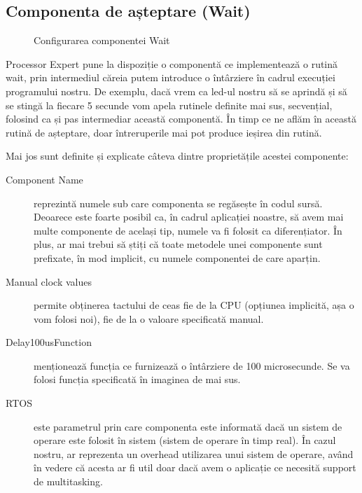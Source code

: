 \newpage

\subsection{Componenta de așteptare (Wait)}

\begin{figure}
    \vspace{-25pt}
    \vspace{-20pt}
    \caption{\label{fig:CodeWarrior-Wait} Configurarea componentei Wait}
    \vspace{-10pt}
\end{figure}

Processor Expert pune la dispoziție o componentă ce implementează o rutină wait, prin intermediul căreia putem introduce o întârziere în cadrul execuției programului nostru. De exemplu, dacă vrem ca led-ul nostru să se aprindă și să se stingă la fiecare 5 secunde vom apela rutinele definite mai sus, secvențial, folosind ca și pas intermediar această componentă. În timp ce ne aflăm în această rutină de așteptare, doar întreruperile mai pot produce ieșirea din rutină.

Mai jos sunt definite și explicate câteva dintre proprietățile acestei componente:

\begin{description}
    \item[Component Name] reprezintă numele sub care componenta se regăsește în codul sursă. Deoarece este foarte posibil ca, în cadrul aplicației noastre, să avem mai multe componente de același tip, numele va fi folosit ca diferențiator. În plus, ar mai trebui să știți că toate metodele unei componente sunt prefixate, în mod implicit, cu numele componentei de care aparțin.
    \item[Manual clock values] permite obținerea tactului de ceas fie de la CPU (opțiunea implicită, așa o vom folosi noi), fie de la o valoare specificată manual.
    \item[Delay100usFunction] menționează funcția ce furnizează o întârziere de 100 microsecunde. Se va folosi funcția specificată în imaginea de mai sus.
    \item[RTOS] este parametrul prin care componenta este informată dacă un sistem de operare este folosit în sistem (sistem de operare în timp real). În cazul nostru, ar reprezenta un overhead utilizarea unui sistem de operare, având în vedere că acesta ar fi util doar dacă avem o aplicație ce necesită support de multitasking.
\end{description}

